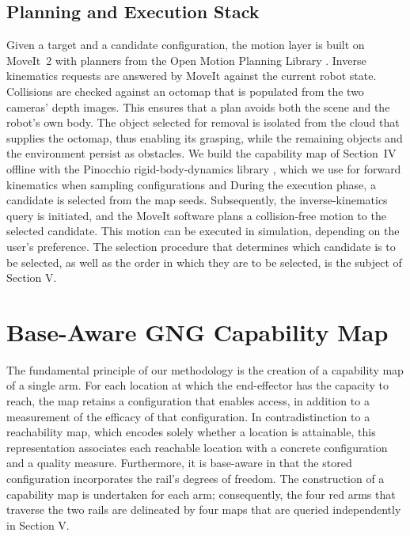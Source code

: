 \documentclass[conference]{IEEEtran}
\begin{document}
\subsection{Planning and Execution Stack}

Given a target and a candidate configuration, the motion layer is built on MoveIt~2
\cite{Coleman2014} with planners from the Open Motion Planning Library
\cite{Sucan2012}.  Inverse kinematics requests are answered by MoveIt against 
the current robot state. Collisions are checked against an octomap that is 
populated from the two cameras' depth images. This ensures that a plan avoids 
both the scene and the robot's own body. The object selected for removal is 
isolated from the cloud that supplies the octomap, thus enabling its grasping, 
while the remaining objects and the environment persist as obstacles. 
We build the capability map of Section~IV offline with the Pinocchio rigid-body-dynamics
library \cite{Carpentier2019}, which we use for forward kinematics when sampling
configurations and  During the execution 
phase, a candidate is selected from the map seeds. Subsequently, the inverse-kinematics 
query is initiated, and the MoveIt software plans a collision-free motion to 
the selected candidate. This motion can be executed in simulation, depending on 
the user's preference. The selection procedure that determines which candidate is 
to be selected, as well as the order in which they are to be selected, is the 
subject of Section V.

\section{Base-Aware GNG Capability Map}

The fundamental principle of our methodology is the creation of a capability map 
of a single arm. For each location at which the end-effector has the capacity 
to reach, the map retains a configuration that enables access, in addition to a 
measurement of the efficacy of that configuration. In contradistinction to a 
reachability map, which encodes solely whether a location is attainable, 
this representation associates each reachable location with a concrete 
configuration and a quality measure. Furthermore, it is base-aware in 
that the stored configuration incorporates the rail's degrees of freedom. 
The construction of a capability map is undertaken for each arm; consequently, 
the four red arms that traverse the two rails are delineated by four maps 
that are queried independently in Section V.
\end{document}
